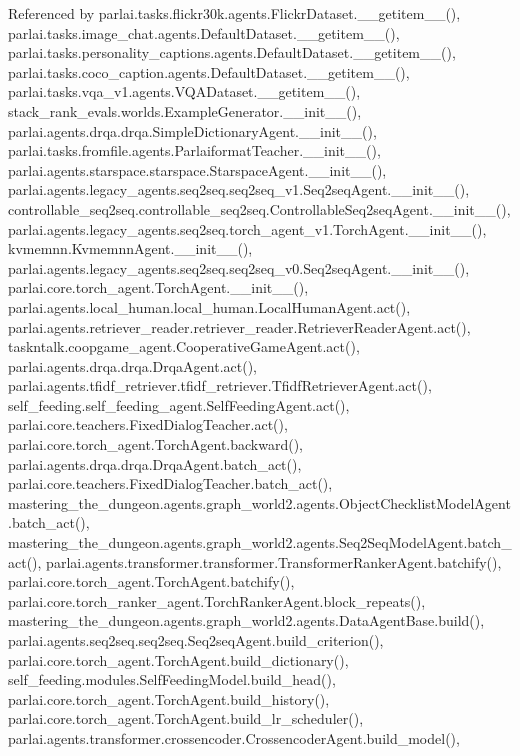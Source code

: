 Referenced by parlai.\+tasks.\+flickr30k.\+agents.\+Flickr\+Dataset.\+\_\+\+\_\+getitem\+\_\+\+\_\+(), parlai.\+tasks.\+image\+\_\+chat.\+agents.\+Default\+Dataset.\+\_\+\+\_\+getitem\+\_\+\+\_\+(), parlai.\+tasks.\+personality\+\_\+captions.\+agents.\+Default\+Dataset.\+\_\+\+\_\+getitem\+\_\+\+\_\+(), parlai.\+tasks.\+coco\+\_\+caption.\+agents.\+Default\+Dataset.\+\_\+\+\_\+getitem\+\_\+\+\_\+(), parlai.\+tasks.\+vqa\+\_\+v1.\+agents.\+V\+Q\+A\+Dataset.\+\_\+\+\_\+getitem\+\_\+\+\_\+(), stack\+\_\+rank\+\_\+evals.\+worlds.\+Example\+Generator.\+\_\+\+\_\+init\+\_\+\+\_\+(), parlai.\+agents.\+drqa.\+drqa.\+Simple\+Dictionary\+Agent.\+\_\+\+\_\+init\+\_\+\+\_\+(), parlai.\+tasks.\+fromfile.\+agents.\+Parlaiformat\+Teacher.\+\_\+\+\_\+init\+\_\+\+\_\+(), parlai.\+agents.\+starspace.\+starspace.\+Starspace\+Agent.\+\_\+\+\_\+init\+\_\+\+\_\+(), parlai.\+agents.\+legacy\+\_\+agents.\+seq2seq.\+seq2seq\+\_\+v1.\+Seq2seq\+Agent.\+\_\+\+\_\+init\+\_\+\+\_\+(), controllable\+\_\+seq2seq.\+controllable\+\_\+seq2seq.\+Controllable\+Seq2seq\+Agent.\+\_\+\+\_\+init\+\_\+\+\_\+(), parlai.\+agents.\+legacy\+\_\+agents.\+seq2seq.\+torch\+\_\+agent\+\_\+v1.\+Torch\+Agent.\+\_\+\+\_\+init\+\_\+\+\_\+(), kvmemnn.\+Kvmemnn\+Agent.\+\_\+\+\_\+init\+\_\+\+\_\+(), parlai.\+agents.\+legacy\+\_\+agents.\+seq2seq.\+seq2seq\+\_\+v0.\+Seq2seq\+Agent.\+\_\+\+\_\+init\+\_\+\+\_\+(), parlai.\+core.\+torch\+\_\+agent.\+Torch\+Agent.\+\_\+\+\_\+init\+\_\+\+\_\+(), parlai.\+agents.\+local\+\_\+human.\+local\+\_\+human.\+Local\+Human\+Agent.\+act(), parlai.\+agents.\+retriever\+\_\+reader.\+retriever\+\_\+reader.\+Retriever\+Reader\+Agent.\+act(), taskntalk.\+coopgame\+\_\+agent.\+Cooperative\+Game\+Agent.\+act(), parlai.\+agents.\+drqa.\+drqa.\+Drqa\+Agent.\+act(), parlai.\+agents.\+tfidf\+\_\+retriever.\+tfidf\+\_\+retriever.\+Tfidf\+Retriever\+Agent.\+act(), self\+\_\+feeding.\+self\+\_\+feeding\+\_\+agent.\+Self\+Feeding\+Agent.\+act(), parlai.\+core.\+teachers.\+Fixed\+Dialog\+Teacher.\+act(), parlai.\+core.\+torch\+\_\+agent.\+Torch\+Agent.\+backward(), parlai.\+agents.\+drqa.\+drqa.\+Drqa\+Agent.\+batch\+\_\+act(), parlai.\+core.\+teachers.\+Fixed\+Dialog\+Teacher.\+batch\+\_\+act(), mastering\+\_\+the\+\_\+dungeon.\+agents.\+graph\+\_\+world2.\+agents.\+Object\+Checklist\+Model\+Agent.\+batch\+\_\+act(), mastering\+\_\+the\+\_\+dungeon.\+agents.\+graph\+\_\+world2.\+agents.\+Seq2\+Seq\+Model\+Agent.\+batch\+\_\+act(), parlai.\+agents.\+transformer.\+transformer.\+Transformer\+Ranker\+Agent.\+batchify(), parlai.\+core.\+torch\+\_\+agent.\+Torch\+Agent.\+batchify(), parlai.\+core.\+torch\+\_\+ranker\+\_\+agent.\+Torch\+Ranker\+Agent.\+block\+\_\+repeats(), mastering\+\_\+the\+\_\+dungeon.\+agents.\+graph\+\_\+world2.\+agents.\+Data\+Agent\+Base.\+build(), parlai.\+agents.\+seq2seq.\+seq2seq.\+Seq2seq\+Agent.\+build\+\_\+criterion(), parlai.\+core.\+torch\+\_\+agent.\+Torch\+Agent.\+build\+\_\+dictionary(), self\+\_\+feeding.\+modules.\+Self\+Feeding\+Model.\+build\+\_\+head(), parlai.\+core.\+torch\+\_\+agent.\+Torch\+Agent.\+build\+\_\+history(), parlai.\+core.\+torch\+\_\+agent.\+Torch\+Agent.\+build\+\_\+lr\+\_\+scheduler(), parlai.\+agents.\+transformer.\+crossencoder.\+Crossencoder\+Agent.\+build\+\_\+model(), 